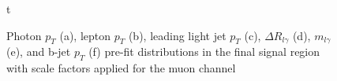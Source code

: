 \begin{figure}[]
\hfil  t
\caption{Photon $p_T$ (a), lepton $p_T$ (b), leading light jet $p_T$ (c), $\Delta R_{l\gamma}$ (d), $m_{l \gamma}$ (e), and b-jet $p_T$ (f) pre-fit distributions in the final signal region with scale factors applied for the muon channel}
\label{fig:SRmuj1}
\end{figure}


